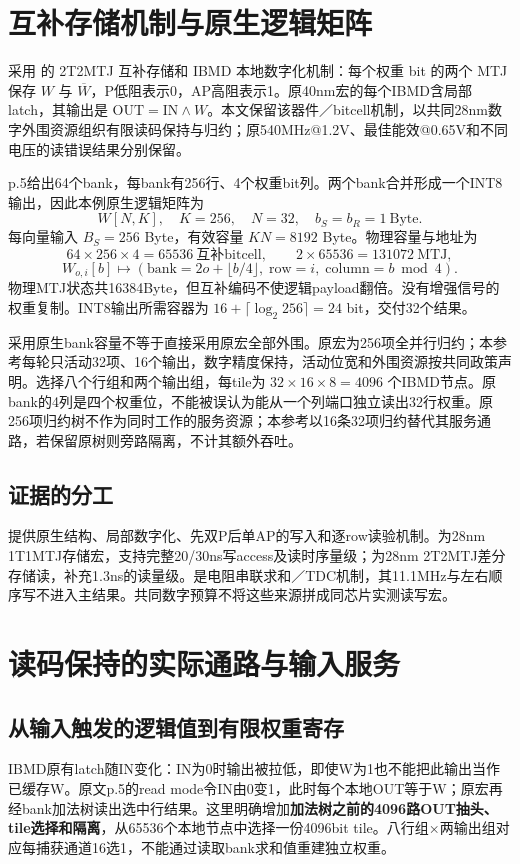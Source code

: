 \section{互补存储机制与原生逻辑矩阵}

采用  的 2T2MTJ 互补存储和 IBMD 本地数字化机制：每个权重 bit 的两个 MTJ 保存 $W$ 与 $\overline W$，P低阻表示0，AP高阻表示1。原40nm宏的每个IBMD含局部latch，其输出是 $\mathrm{OUT}=\mathrm{IN}\land W$。本文保留该器件／bitcell机制，以共同28nm数字外围资源组织有限读码保持与归约；原540MHz@1.2V、最佳能效@0.65V和不同电压的读错误结果分别保留。

 p.5给出64个bank，每bank有256行、4个权重bit列。两个bank合并形成一个INT8输出，因此本例原生逻辑矩阵为
\[
W[N,K],\quad K=256,\quad N=32,\quad b_S=b_R=1\ \mathrm{Byte}.
\]
每向量输入 $B_S=256$ Byte，有效容量 $KN=8192$ Byte。物理容量与地址为
\[
64\times256\times4=65536\ \text{互补bitcell},\qquad
2\times65536=131072\ \text{MTJ},
\]
\[
W_{o,i}[b]\longmapsto (\mathrm{bank}=2o+\lfloor b/4\rfloor,\;\mathrm{row}=i,\;\mathrm{column}=b\bmod4).
\]
物理MTJ状态共16384Byte，但互补编码不使逻辑payload翻倍。没有增强信号的权重复制。INT8输出所需容器为 $16+\lceil\log_2 256\rceil=24$ bit，交付32个结果。

采用原生bank容量不等于直接采用原宏全部外围。原宏为256项全并行归约；本参考每轮只活动32项、16个输出，数字精度保持，活动位宽和外围资源按共同政策声明。选择八个行组和两个输出组，每tile为 $32\times16\times8=4096$ 个IBMD节点。原bank的4列是四个权重位，不能被误认为能从一个列端口独立读出32行权重。原256项归约树不作为同时工作的服务资源；本参考以16条32项归约替代其服务通路，若保留原树则旁路隔离，不计其额外吞吐。

\subsection{证据的分工}
提供原生结构、局部数字化、先双P后单AP的写入和逐row读验机制。为28nm 1T1MTJ存储宏，支持完整20/30ns写access及读时序量级；为28nm 2T2MTJ差分存储读，补充1.3ns的读量级。是电阻串联求和／TDC机制，其11.1MHz与左右顺序写不进入主结果。共同数字预算不将这些来源拼成同芯片实测读写宏。

\clearpage
\section{读码保持的实际通路与输入服务}

\subsection{从输入触发的逻辑值到有限权重寄存}
IBMD原有latch随IN变化：IN为0时输出被拉低，即使W为1也不能把此输出当作已缓存W。原文p.5的read mode令IN由0变1，此时每个本地OUT等于W；原宏再经bank加法树读出选中行结果。这里明确增加\textbf{加法树之前的4096路OUT抽头、tile选择和隔离}，从65536个本地节点中选择一份4096bit tile。八行组×两输出组对应每捕获通道16选1，不能通过读取bank求和值重建独立权重。

